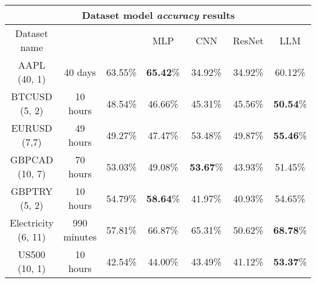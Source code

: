 \begin{center}
	\begin{tabular}{|| c || c | c | c | c | c | c ||}
		\hline
		\multicolumn{7}{|c|}{Dataset model \emph{accuracy} results}                                                                                                                                          \\
		\hline
		Dataset name        & \vtop{\hbox{\strut Prediction}\hbox{\strut timestep}} & \vtop{\hbox{\strut Linear}\hbox{\strut Regression}} & MLP              & CNN              & ResNet  & LLM              \\ [0.5ex]
		\hline\hline
		AAPL (40, 1)        & 40 days                                               & 63.55\%                                             & \textbf{65.42}\% & 34.92\%          & 34.92\% & 60.12\%          \\
		\hline
		BTCUSD (5, 2)       & 10 hours                                              & 48.54\%                                             & 46.66\%          & 45.31\%          & 45.56\% & \textbf{50.54}\% \\
		\hline
		EURUSD (7,7)        & 49 hours                                              & 49.27\%                                             & 47.47\%          & 53.48\%          & 49.87\% & \textbf{55.46}\% \\
		\hline
		GBPCAD (10, 7)      & 70 hours                                              & 53.03\%                                             & 49.08\%          & \textbf{53.67}\% & 43.93\% & 51.45\%          \\
		\hline
		GBPTRY (5, 2)       & 10 hours                                              & 54.79\%                                             & \textbf{58.64}\% & 41.97\%          & 40.93\% & 54.65\%          \\
		\hline
		Electricity (6, 11) & 990 minutes                                           & 57.81\%                                             & 66.87\%          & 65.31\%          & 50.62\% & \textbf{68.78}\% \\
		\hline
		US500 (10, 1)       & 10 hours                                              & 42.54\%                                             & 44.00\%          & 43.49\%          & 41.12\% & \textbf{53.37}\% \\
		\hline

		\hline
	\end{tabular}
\end{center}


